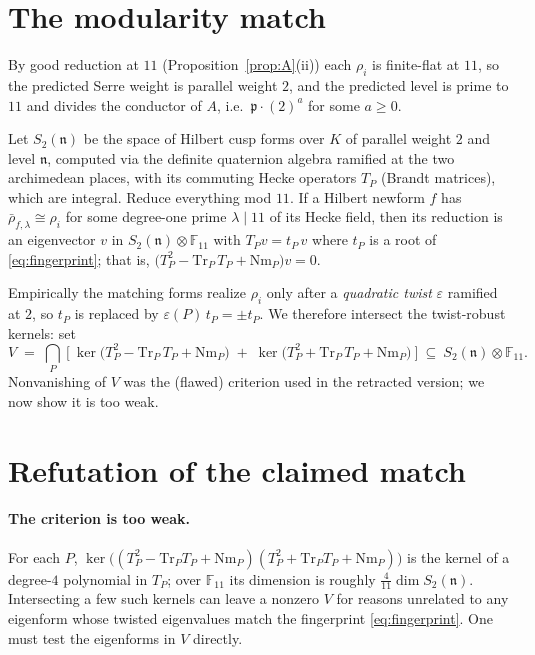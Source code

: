 \documentclass[11pt]{article}
\newcommand{\bbF}{\mathbb{F}}
\newcommand{\rhob}{\bar{\rho}}
\newcommand{\Tr}{\mathrm{Tr}}
\newcommand{\Nm}{\mathrm{Nm}}
\begin{document}
\section{The modularity match}

By good reduction at $11$ (Proposition~\ref{prop:A}(ii)) each $\rho_i$ is finite-flat at $11$,
so the predicted Serre weight is parallel weight $2$, and the predicted level is prime to $11$
and divides the conductor of $A$, i.e.\ $\mathfrak p\cdot (2)^{a}$ for some $a\ge0$.

Let $S_2(\mathfrak n)$ be the space of Hilbert cusp forms over $K$ of parallel weight $2$ and
level $\mathfrak n$, computed via the definite quaternion algebra ramified at the two
archimedean places, with its commuting Hecke operators $T_P$ (Brandt matrices), which are
integral. Reduce everything mod $11$. If a Hilbert newform $f$ has
$\rhob_{f,\lambda}\cong\rho_i$ for some degree-one prime $\lambda\mid 11$ of its Hecke field,
then its reduction is an eigenvector $v$ in $S_2(\mathfrak n)\otimes\bbF_{11}$ with
$T_P v = t_P\,v$ where $t_P$ is a root of \eqref{eq:fingerprint}; that is,
$\big(T_P^2 - \Tr_P\,T_P + \Nm_P\big)v=0$.

Empirically the matching forms realize $\rho_i$ only after a {\it quadratic twist}
$\varepsilon$ ramified at $2$, so $t_P$ is replaced by $\varepsilon(P)\,t_P=\pm t_P$. We
therefore intersect the twist-robust kernels: set
\begin{equation}\label{eq:V}
V \;=\; \bigcap_{P}\ \Big[\ \ker\!\big(T_P^2 - \Tr_P\,T_P + \Nm_P\big)\;+\;
\ker\!\big(T_P^2 + \Tr_P\,T_P + \Nm_P\big)\ \Big] \ \subseteq\ S_2(\mathfrak n)\otimes\bbF_{11}.
\end{equation}
Nonvanishing of $V$ was the (flawed) criterion used in the retracted version; we now show it
is too weak.

\section{Refutation of the claimed match}\label{sec:refutation}

\paragraph{The criterion is too weak.} For each $P$, $\ker\big((T_P^2-\Tr_P T_P+\Nm_P)
(T_P^2+\Tr_P T_P+\Nm_P)\big)$ is the kernel of a degree-$4$ polynomial in $T_P$; over
$\bbF_{11}$ its dimension is roughly $\tfrac{4}{11}\dim S_2(\mathfrak n)$. Intersecting a few
such kernels can leave a nonzero $V$ for reasons unrelated to any eigenform whose twisted
eigenvalues match the fingerprint \eqref{eq:fingerprint}. One must test the eigenforms in $V$
directly.
\end{document}

